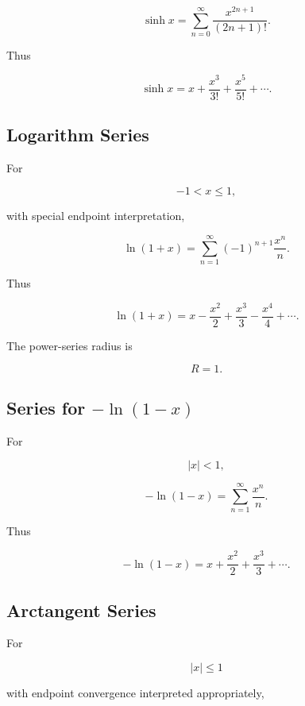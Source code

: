 \[
\boxed{
\sinh x
=
\sum_{n=0}^{\infty}
\frac{
x^{2n+1}
}{
(2n+1)!
}.
}
\]

Thus

\[
\boxed{
\sinh x
=
x+\frac{x^3}{3!}
+\frac{x^5}{5!}
+\cdots.
}
\]

\subsection{Logarithm Series}
\label{subsec:logarithm-series-reference}

For

\[
-1<x\leq1,
\]

with special endpoint interpretation,

\[
\boxed{
\ln(1+x)
=
\sum_{n=1}^{\infty}
(-1)^{n+1}
\frac{x^n}{n}.
}
\]

Thus

\[
\boxed{
\ln(1+x)
=
x
-\frac{x^2}{2}
+\frac{x^3}{3}
-\frac{x^4}{4}
+\cdots.
}
\]

The power-series radius is

\[
\boxed{
R=1.
}
\]

\subsection{Series for \(-\ln(1-x)\)}
\label{subsec:negative-log-one-minus-x}

For

\[
|x|<1,
\]

\[
\boxed{
-\ln(1-x)
=
\sum_{n=1}^{\infty}
\frac{x^n}{n}.
}
\]

Thus

\[
\boxed{
-\ln(1-x)
=
x+\frac{x^2}{2}
+\frac{x^3}{3}
+\cdots.
}
\]

\subsection{Arctangent Series}
\label{subsec:arctangent-series-reference}

For

\[
|x|\leq1
\]

with endpoint convergence interpreted appropriately,

